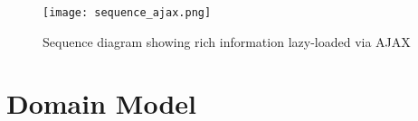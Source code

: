 \documentclass[a4paper]{report}
\begin{document}
\begin{comment}
@startuml sequence_ajax.png

skinparam monochrome true

actor User
participant "BBC Website" as www
participant "Search Service" as search
participant "Search Indexes" as indexes
participant "Source Service" as source

User -> www : types query into search box
activate www

  www -> search
  activate search

    note over search
      The service may want to vary the
      query for a number of reasons such
      as the type of device the user has
      or the nature of the query itself.
    end note

    search -> search : decide query parameters

    search -> indexes : raw query
    activate indexes
    indexes --> search : list of matching items
    deactivate indexes

    search --> www : Return stub items
    deactivate search
    
    www --> User : search results page

    note over www
      Website remains active using Javascript to do 
      AJAX requests for further information for
      each result.
    end note

    loop for each item
      www ->> search : Fetch more info about item
      activate search
      search -> source : Proxy to source for info
      activate source
      source --> search : Return info in source's own format
      deactivate source
      search --> www : Return info in common format
      deactivate search
      www --> User : Update page in front of user as info arrives
    end

deactivate www

@enduml
\end{comment}
\begin{figure}[p]
  \begin{center}
    \texttt{[image: sequence\_ajax.png]}
  \end{center}
  \caption{Sequence diagram showing rich information lazy-loaded via AJAX\label{sequence-ajax}}
\end{figure}

\section{Domain Model}
\end{document}

